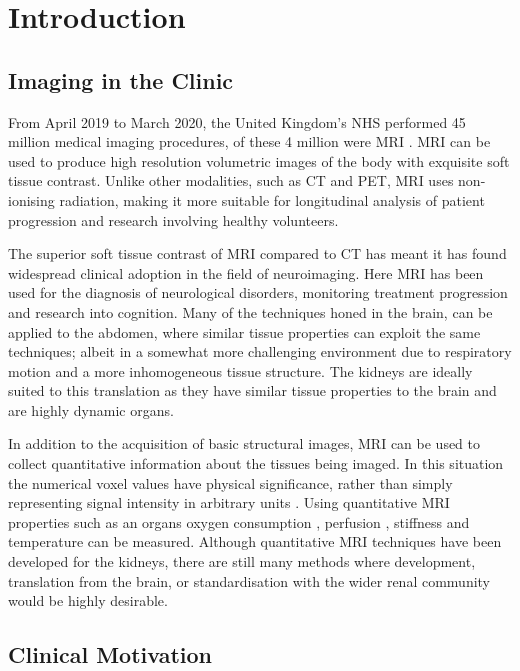 \chapter{Introduction}
\label{chap:intro}
\section{Imaging in the Clinic}
\label{sec:intro_imaging}
From April 2019 to March 2020, the United Kingdom's \ac{NHS} performed 45 million medical imaging procedures, of these 4 million were \ac{MRI} \cite{noauthor_diagnostic_2020}. \ac{MRI} can be used to produce high resolution volumetric images of the body with exquisite soft tissue contrast. Unlike other modalities, such as \ac{CT} and \ac{PET}, \ac{MRI} uses non-ionising radiation, making it more suitable for longitudinal analysis of patient progression and research involving healthy volunteers.

The superior soft tissue contrast of \ac{MRI} compared to \ac{CT} has meant it has found widespread clinical adoption in the field of neuroimaging. Here \ac{MRI} has been used for the diagnosis of neurological disorders, monitoring treatment progression and research into cognition. Many of the techniques honed in the brain, can be applied to the abdomen, where similar tissue properties can exploit the same techniques; albeit in a somewhat more challenging environment due to respiratory motion and a more inhomogeneous tissue structure. The kidneys are ideally suited to this translation as they have similar tissue properties to the brain and are highly dynamic organs.

In addition to the acquisition of basic structural images, \ac{MRI} can be used to collect quantitative information about the tissues being imaged. In this situation the numerical voxel values have physical significance, rather than simply representing signal intensity in arbitrary units \cite{tofts_quantitative_2003}. Using quantitative \ac{MRI} properties such as an organs oxygen consumption \cite{zhang_quantitative_2015}, perfusion \cite{karger_quantitation_2000}, stiffness \cite{mariappan_magnetic_2010} and temperature \cite{yuan_towards_2012} can be measured. Although quantitative \ac{MRI} techniques have been developed for the kidneys, there are still many methods where development, translation from the brain, or standardisation with the wider renal community would be highly desirable.

\section{Clinical Motivation}
\label{sec:intro_clinical}


